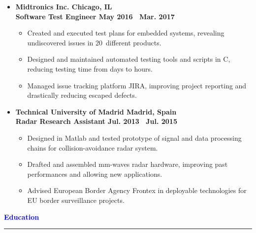 \documentclass[10pt, letterpaper]{letter}
\def\myplus{\hspace{-.3em}\raisebox{.4ex}{ \tiny +}}
\def\csharp{C\nolinebreak[4]\hspace{-.3em}\raisebox{.25ex}{ \small \#}}
\begin{document}
\begin{itemize}[label=, leftmargin=0em]
\vfill

    \item
    \textbf{Midtronics Inc. \hfill Chicago, IL}\vspace{2pt}\\
    \textbf{Software Test Engineer \hfill May 2016 \textendash\ Mar. 2017}\vspace{2pt}
    \begin{itemize}[nosep, leftmargin=1.15em]
        \item Created and executed test plans for embedded systems, revealing undiscovered issues in 20\myplus\ different products.
        \item Designed and maintained automated testing tools and scripts in \csharp, reducing testing time from days to hours.
        \item Managed issue tracking platform JIRA, improving project reporting and drastically reducing escaped defects.
    \end{itemize}

\vfill

    \item
    \textbf{Technical University of Madrid \hfill Madrid, Spain}\vspace{2pt}\\
    \textbf{Radar Research Assistant \hfill Jul. 2013 \textendash\ Jul. 2015}\vspace{2pt}
    \begin{itemize}[nosep, leftmargin=1.15em]
        \item Designed in Matlab and tested prototype of signal and data processing chains for collision-avoidance radar system.
        \item Drafted and assembled mm-waves radar hardware, improving past performances and allowing new applications.
        \item Advised European Border Agency Frontex in deployable technologies for EU border surveillance projects.
    \end{itemize}

\end{itemize}

\vfill


\textcolor{Blue}{
    \large\textbf{Education}
    \vspace{3pt}
    \hrule height 1.5pt
}
\end{document}
